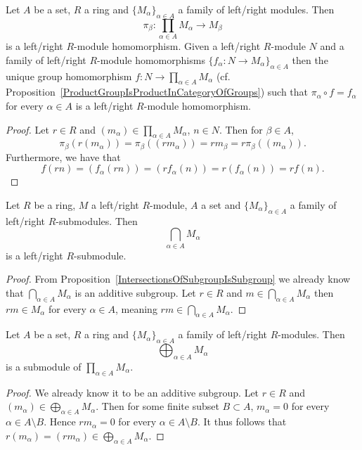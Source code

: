 \begin{proposition}
    Let $A$ be a set, $R$ a ring and $\{M_\alpha\}_{\alpha \in A}$ a family of left/right modules. Then 
    $$\pi_\beta : \prod_{\alpha\in A} M_\alpha \rightarrow M_\beta$$
    is a left/right $R$-module homomorphism. Given a left/right $R$-module $N$ and a family of left/right $R$-module homomorphisms $\{f_\alpha : N \rightarrow M_\alpha\}_{\alpha\in A}$ then the unique group homomorphism $f: N\rightarrow \prod_{\alpha\in A} M_\alpha$ (cf.  Proposition~\ref{ProductGroupIsProductInCategoryOfGroups}) such that $\pi_\alpha \circ f = f_\alpha$ for every $\alpha \in A$ is a left/right $R$-module homomorphism. 
\end{proposition}
\begin{proof}
    Let $r\in R$ and $(m_\alpha)\in \prod_{\alpha \in A} M_\alpha$, $n\in N$. Then for $\beta \in A$, 
    $$\pi_\beta(r(m_\alpha))= \pi_\beta((rm_\alpha)) = rm_\beta = r \pi_\beta((m_\alpha)).$$
    Furthermore, we have that 
    $$f(rn)=(f_\alpha(rn))=(rf_\alpha(n))=r(f_\alpha(n))=rf(n).$$
\end{proof}
\begin{lemma}
    Let $R$ be a ring, $M$ a left/right $R$-module, $A$ a set and $\{M_\alpha\}_{\alpha\in A}$ a family of left/right $R$-submodules. Then 
    $$\bigcap_{\alpha\in A} M_\alpha$$
    is a left/right $R$-submodule.
\end{lemma}
\begin{proof}
    From Proposition~\ref{IntersectionsOfSubgroupIsSubgroup} we already know that $\bigcap_{\alpha\in A} M_\alpha$ is an additive subgroup. Let $r\in R$ and $m\in \bigcap_{\alpha\in A} M_\alpha$ then $rm\in M_\alpha$ for every $\alpha \in A$, meaning $rm \in \bigcap_{\alpha \in A} M_\alpha$.
\end{proof}
\begin{proposition}
    Let $A$ be a set, $R$ a ring and $\{M_\alpha\}_{\alpha \in A}$ a family of left/right $R$-modules. 
    Then
    $$\bigoplus_{\alpha\in A} M_\alpha$$
    is a submodule of $\prod_{\alpha\in A} M_\alpha$.
\end{proposition}
\begin{proof}
    We already know it to be an additive subgroup.
    Let $r \in R$ and $(m_\alpha)\in \bigoplus_{\alpha\in A} M_\alpha$. Then for some finite subset $B\subset A$, $m_\alpha = 0$ for every $\alpha \in A\setminus B$. Hence $rm_\alpha = 0$ for every $\alpha \in A\setminus B$. It thus follows that $r(m_\alpha)=(rm_\alpha)\in \bigoplus_{\alpha \in A} M_\alpha$.
\end{proof}
